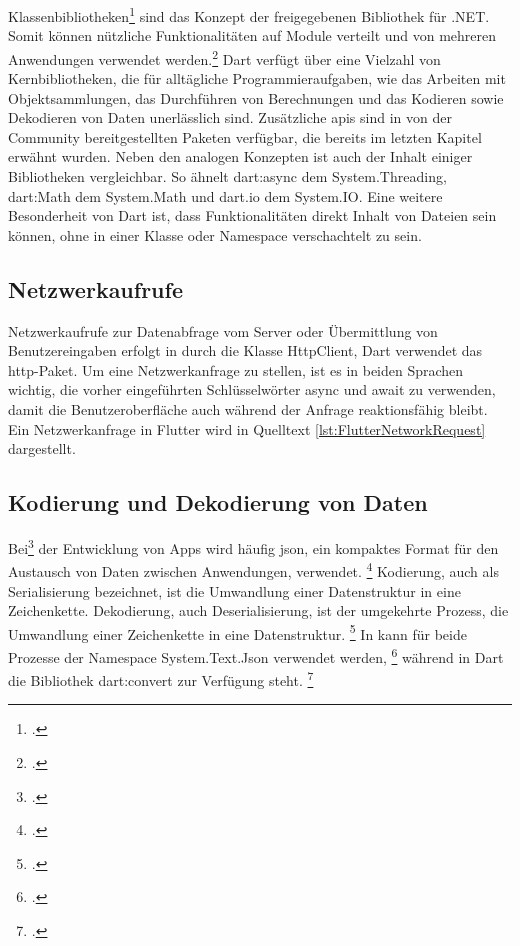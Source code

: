 Klassenbibliotheken\footcitetext[Quelltext in Anlehnung an][Abgerufen am \today]{Pedley2019} sind das Konzept der freigegebenen Bibliothek für .NET.  Somit können nützliche Funktionalitäten auf Module verteilt und von mehreren Anwendungen verwendet werden.\footcite[Vgl. ][Abgerufen am \today]{MicrosoftClassLibary2016} Dart verfügt über eine Vielzahl von Kernbibliotheken, die für alltägliche Programmieraufgaben, wie das Arbeiten mit Objektsammlungen,  das Durchführen von Berechnungen und das Kodieren sowie Dekodieren von Daten unerlässlich sind.  Zusätzliche \acp{api} sind in von der Community bereitgestellten Paketen verfügbar, die bereits im letzten Kapitel erwähnt wurden. Neben den analogen Konzepten ist auch der Inhalt einiger Bibliotheken vergleichbar.  So ähnelt \glq dart:async\grq{} dem  \glq System.Threading\grq, \glq dart:Math\grq{} dem  \glq System.Math\grq{} und \glq dart.io\grq{} dem \glq System.IO\grq. Eine weitere Besonderheit von Dart ist, dass Funktionalitäten direkt Inhalt von Dateien sein können,  ohne in einer Klasse oder Namespace verschachtelt zu sein. 

\subsection{Netzwerkaufrufe}
Netzwerkaufrufe zur Datenabfrage vom Server oder Übermittlung von Benutzereingaben erfolgt in \Csharp{} durch die Klasse HttpClient,  Dart verwendet das http-Paket.  Um eine Netzwerkanfrage zu stellen,  ist es in beiden Sprachen wichtig, die vorher eingeführten Schlüsselwörter \glq async\grq{} und \glq await\grq{} zu verwenden, damit die Benutzeroberfläche auch während der Anfrage reaktionsfähig bleibt.  Ein Netzwerkanfrage in Flutter wird in Quelltext \ref{lst:FlutterNetworkRequest} dargestellt.


\subsection{Kodierung und Dekodierung von Daten}

Bei\footcitetext[Quelltext in Anlehnung an][Abgerufen am \today]{Pedley2019}  der Entwicklung von Apps wird häufig \ac{json}, ein kompaktes Format für den Austausch von Daten zwischen Anwendungen, verwendet.  \footcite[Vgl.][S. 684]{Dobrenz2018}  Kodierung,  auch als Serialisierung bezeichnet,  ist die Umwandlung einer Datenstruktur in eine Zeichenkette.  Dekodierung,  auch Deserialisierung, ist der umgekehrte Prozess,  die Umwandlung einer Zeichenkette in eine Datenstruktur. \footcite[Vgl.][Abgerufen am \today]{GoogleJson} In \Csharp{} kann für beide Prozesse der Namespace \glq System.Text.Json\grq{} verwendet werden, \footcite[Vgl.][Abgerufen am \today]{MicrosoftJson2020} während in Dart die Bibliothek \glq dart:convert\grq{} zur Verfügung steht. \footcite[Vgl.][Abgerufen am \today]{GoogleJson}


